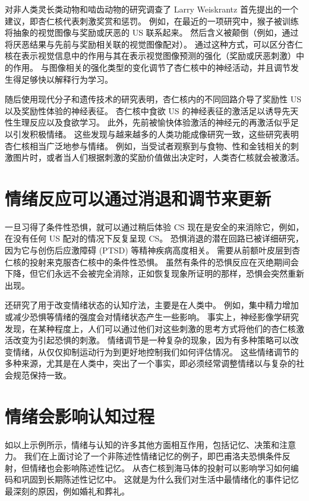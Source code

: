 对非人类灵长类动物和啮齿动物的研究调查了 Larry Weiskrantz 首先提出的一个建议，即杏仁核代表刺激奖赏和惩罚。 例如，在最近的一项研究中，猴子被训练将抽象的视觉图像与奖励或厌恶的 US 联系起来。 然后含义被颠倒（例如，通过将厌恶结果与先前与奖励相关联的视觉图像配对）。 通过这种方式，可以区分杏仁核在表示视觉信息中的作用与其在表示视觉图像预测的强化（奖励或厌恶刺激）中的作用。 与图像相关的强化类型的变化调节了杏仁核中的神经活动，并且调节发生得足够快以解释行为学习。

随后使用现代分子和遗传技术的研究表明，杏仁核内的不同回路介导了奖励性 US 以及奖励性体验的神经表征。 杏仁核中食欲 US 的神经表征的激活足以诱导先天性生理反应以及食欲学习。 此外，先前被愉快体验激活的神经元的再激活似乎足以引发积极情绪。 这些发现与越来越多的人类功能成像研究一致，这些研究表明杏仁核相当广泛地参与情绪。 例如，当受试者观察到与食物、性和金钱相关的刺激图片时，或者当人们根据刺激的奖励价值做出决定时，人类杏仁核就会被激活。


\section{情绪反应可以通过消退和调节来更新}

一旦习得了条件性恐惧，就可以通过稍后体验 CS 现在是安全的来消除它，例如，在没有任何 US 配对的情况下反复呈现 CS。 恐惧消退的潜在回路已被详细研究，因为它与创伤后应激障碍 (PTSD) 等精神疾病高度相关。 需要从前额叶皮层到杏仁核的投射来克服杏仁核中的条件性恐惧。 虽然有条件的恐惧反应在灭绝期间会下降，但它们永远不会被完全消除，正如恢复现象所证明的那样，恐惧会突然重新出现。

还研究了用于改变情绪状态的认知疗法，主要是在人类中。 例如，集中精力增加或减少恐惧等情绪的强度会对情绪状态产生一些影响。 事实上，神经影像学研究发现，在某种程度上，人们可以通过他们对这些刺激的思考方式将他们的杏仁核激活改变为引起恐惧的刺激。 情绪调节是一种复杂的现象，因为有多种策略可以改变情绪，从仅仅抑制运动行为到更好地控制我们如何评估情况。 这些情绪调节的多种来源，尤其是在人类中，突出了一个事实，即必须经常调整情绪以与复杂的社会规范保持一致。

\section{情绪会影响认知过程}
如以上示例所示，情绪与认知的许多其他方面相互作用，包括记忆、决策和注意力。 我们在上面讨论了一个非陈述性情绪记忆的例子，即巴甫洛夫恐惧条件反射，但情绪也会影响陈述性记忆。 从杏仁核到海马体的投射可以影响学习如何编码和巩固到长期陈述性记忆中。 这就是为什么我们对生活中最情绪化的事件记忆最深刻的原因，例如婚礼和葬礼。

